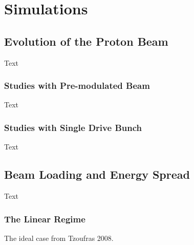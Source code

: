 %
%

\chapter{Simulations}
\label{Ch:Sim}

\section{Evolution of the Proton Beam}
\label{Sim:PBeam}

Text

\subsection{Studies with Pre-modulated Beam}
\label{Sim:PBPreMod}

Text

\subsection{Studies with Single Drive Bunch}
\label{Sim:PBSingle}

Text

\section{Beam Loading and Energy Spread}
\label{Sim:BLoad}

Text

\subsection{The Linear Regime}
\label{Sim:Lin}

The ideal case from Tzoufras 2008.

